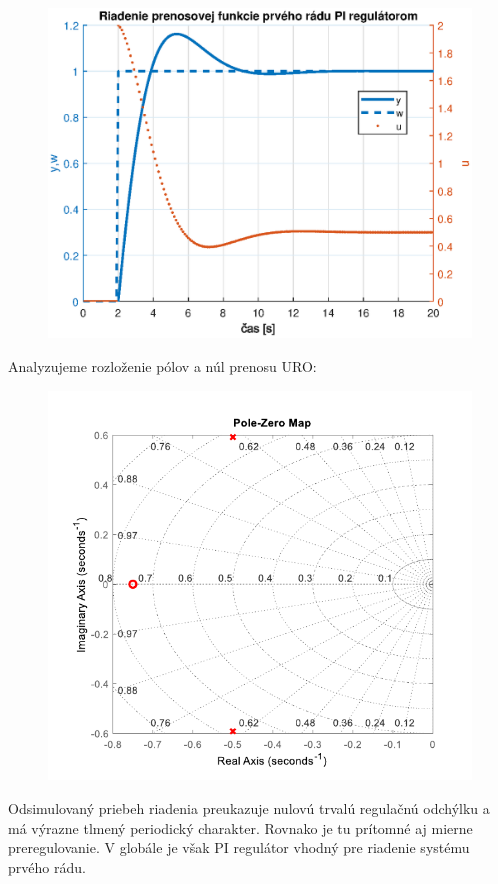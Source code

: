 \documentclass[a4paper,10pt]{article}
\begin{document}
\begin{figure}[ht]
\centering
\includegraphics[scale=0.55]{PI_control}
\end{figure}

Analyzujeme rozloženie pólov a núl prenosu URO:

\begin{figure}[ht]
\centering
\includegraphics[scale=0.75]{pzmap_PI}
\end{figure}

Odsimulovaný priebeh riadenia preukazuje nulovú trvalú regulačnú odchýlku a má výrazne tlmený periodický charakter. Rovnako je tu prítomné aj mierne preregulovanie.
V globále je však PI regulátor vhodný pre riadenie systému prvého rádu.
\end{document}
